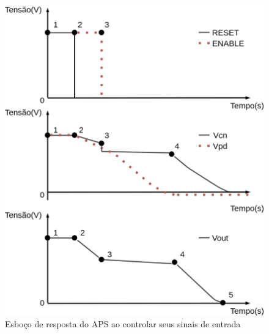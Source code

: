 \begin{figure}[htb]
	\caption{\label{figura_estagiosAPS}Esbo{\c c}o de resposta do APS ao controlar seus sinais de entrada}
	\begin{center}
	    \includegraphics[scale=0.2]{Imagens/estagiosAPS.png}
	\end{center}
\end{figure}

